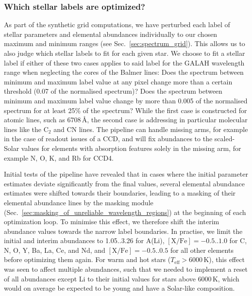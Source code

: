 \documentclass[
  journal=pasa,
  manuscript=research-paper, %
  year=2024,
  volume=37
]{cup-journal}
\newcommand\ion[2]{\text{#1\,\textsc{\lowercase{#2}}}}	%
\newcommand{\K}{\,\mathrm{K}}	%
\begin{document}
\subsubsection{Which stellar labels are optimized?} \label{sec:which_labels_are_optimized}


As part of the synthetic grid computations, we have perturbed each label of stellar parameters and elemental abundances individually to our chosen maximum and minimum ranges (see Sec.~\ref{sec:spectrum_grid}). This allows us to also judge which stellar labels to fit for each given star. We choose to fit a stellar label if either of these two cases applies to said label for the GALAH wavelength range when neglecting the cores of the Balmer lines: Does the spectrum between minimum and maximum label value at any pixel change more than a certain threshold (0.07 of the normalised spectrum)? Does the spectrum between minimum and maximum label value change by more than 0.005 of the normalised spectrum for at least 25\% of the spectrum? While the first case is constructed for atomic lines, such as \ion{Li}{i} 6708\,\AA, the second case is addressing in particular molecular lines like the $\mathrm{C_2}$ and $\mathrm{CN}$ lines. The pipeline can handle missing arms, for example in the case of readout issues of a CCD, and will fix abundances to the scaled-Solar values for elements with absorption features solely in the missing arm, for example N, O, K, and Rb for CCD4.

Initial tests of the pipeline have revealed that in cases where the initial parameter estimates deviate significantly from the final values, several elemental abundance estimates were shifted towards their boundaries, leading to a masking of their elemental abundance lines by the masking module (Sec.~\ref{sec:masking_of_unreliable_wavelength_regions}) at the beginning of each optimization loop. To minimise this effect, we therefore shift the interim abundance values towards the narrow label boundaries. In practise, we limit the initial and interim abundances to 1.05..3.26 for A(Li), $\mathrm{[X/Fe]} = -0.5..1.0$ for C, N, O, Y, Ba, La, Ce, and Nd, and $\mathrm{[X/Fe]} = -0.5..0.5$ for all other elements before optimizing them again. For warm and hot stars ($T_\text{eff} > 6000\K$), this effect was seen to affect multiple abundances, such that we needed to implement a reset of all abundances except Li to their initial values for stars above $6000\K$, which would on average be expected to be young and have a Solar-like composition.
\end{document}
